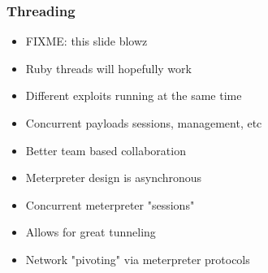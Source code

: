 \documentclass{beamer}
\newenvironment{sitemize}{\vspace{1mm}\begin{itemize}\itemsep 4pt\small}{\end{itemize}}
\begin{document}
\begin{frame}[t]
  \frametitle{Threading}

  \begin{sitemize}
    \item FIXME: this slide blowz
    \item Ruby threads will hopefully work
    \item Different exploits running at the same time
    \item Concurrent payloads sessions, management, etc
    \item Better team based collaboration
    \item Meterpreter design is asynchronous
    \item Concurrent meterpreter "sessions"
    \item Allows for great tunneling
    \item Network "pivoting" via meterpreter protocols
  \end{sitemize}
\end{frame}
\end{document}

